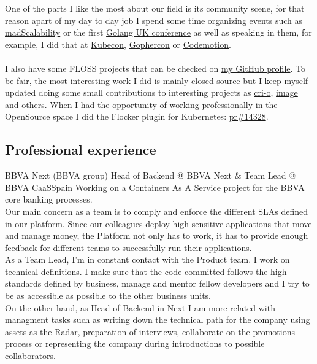 \documentclass[11pt, a4paper, sans]{moderncv}
\begin{document}
\makecvtitle


%
%

One of the parts I like the most about our field is its community scene, for that reason apart of my day to day job
I spend some time organizing events such as \href{https://www.meetup.com/mad-scalability/}{madScalability} or
the first \href{https://golanguk.com/}{Golang UK conference} as well as speaking in them,
for example, I did that at \href{https://www.kubecon.io}{Kubecon}, \href{https://www.gophercon.co.uk/}{Gophercon} or \href{https://codemotionworld.com/}{Codemotion}.\\
\\
I also have some FLOSS projects that can be checked on \href{https://github.com/agonzalezro}{my GitHub profile}.
To be fair, the most interesting work I did is mainly closed source but I keep myself updated doing some small contributions to interesting projects as \href{https://github.com/agonzalezro/cri-o}{cri-o}, \href{https://github.com/containers/image}{image} and others.
When I had the opportunity of working professionally in the OpenSource space I did the Flocker plugin for Kubernetes: \href{https://github.com/kubernetes/kubernetes/pull/14328}{pr\#14328}.\\

\subsection{Professional experience}
{BBVA Next (BBVA group)}
{Head of Backend @ BBVA Next \& Team Lead @ BBVA CaaS}{Spain}{}
{Working on a Containers As A Service project for the BBVA core banking processes.\\
Our main concern as a team is to comply and enforce the different SLAs defined in our platform. Since our colleagues deploy high sensitive applications that move and manage money, the Platform not only has to work, it has to provide enough feedback for different teams to successfully run their applications.\\
As a Team Lead, I’m in constant contact with the Product team. I work on technical definitions. I make sure that the code committed follows the high standards defined by business, manage and mentor fellow developers and I try to be as accessible as possible to the other business units.\\
On the other hand, as Head of Backend in Next I am more related with managment tasks such as writing down the technical path for the company using assets as the Radar, preparation of interviews, collaborate on the promotions process or representing the company during introductions to possible collaborators.\\}
\end{document}
